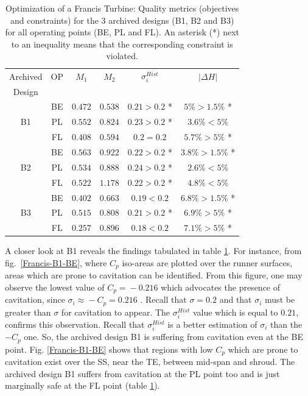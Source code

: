 \begin{table}[h!]
\begin{center}
\begin{tabular}{ |c|c|c|c|c|c| }
\hline
Archived & OP & $M_1$ & $M_2$  & $\sigma_i^{Hist}$ & $|\Delta H|$\\
Design &&&&&\\
\hline
 & BE & $0.472$ & $0.538$ & $0.21 > 0.2$ * & $ 5\% >1.5\%$ * \\
B1 & PL & $0.552$ & $0.824$ & $0.23 > 0.2$ * & $ 3.6\% <5\%$ \\
& FL & $0.408$ & $0.594$ & $0.2 = 0.2$  & $ 5.7\% >5\%$ * \\
\hline
\hline
& BE & $0.563$ & $0.922$ & $0.22 > 0.2$ * & $ 3.8\% >1.5\%$ * \\
B2 & PL & $0.534$ & $0.888$ & $0.24 > 0.2$ * & $ 2.6\% <5\%$  \\
& FL & $0.522$ & $1.178$ & $0.22 > 0.2$ * & $ 4.8\% <5\%$  \\
\hline
\hline
& BE & $0.402$ & $0.663$ & $0.19 < 0.2$  & $ 6.8\% >1.5\%$ * \\
B3 & PL & $0.515$ & $0.808$ & $0.21 > 0.2$ * & $ 6.9\% >5\%$ * \\
& FL & $0.257$ & $0.896$ & $0.18 < 0.2$  & $ 7.1\% >5\%$ * \\
\hline
\end{tabular}
\caption{Optimization of a Francis Turbine: Quality metrics (objectives and constraints) for the 3 archived designs (B1, B2 and B3) for all operating points (BE, PL and FL). An asterisk (*) next to an inequality means that the corresponding constraint is violated.}
\label{reuse}
\end{center}
\end{table}

A closer look at B1 reveals the findings tabulated in table \ref{reuse}. For instance, from fig.\ \ref{Francis-B1-BE}, where $C_p$ iso-areas are plotted over the runner surfaces, areas which are prone to cavitation can be identified. From this figure, one may observe the lowest value of $C_p \!= \!-0.216$ which advocates the presence of cavitation, since $\sigma_i \! \approx \! -C_p \!= \!0.216$  . Recall that $\sigma \! = \! 0.2$ and that $\sigma_i$ must be greater than $\sigma$ for cavitation to appear. The $\sigma_i^{Hist}$ value which is equal to $0.21$, confirms this observation. Recall that $\sigma_i^{Hist}$ is a better estimation of $\sigma_i$ than the $-C_p$ one. So, the archived design B1 is suffering from cavitation even at the BE point. Fig. \ref{Francis-B1-BE} shows that regions with low $C_p$ which are prone to cavitation exist over the SS, near the TE, between mid-span and shroud. The archived design B1 suffers from cavitation at the PL point too and is just marginally safe at the FL  point (table \ref{reuse}). 

